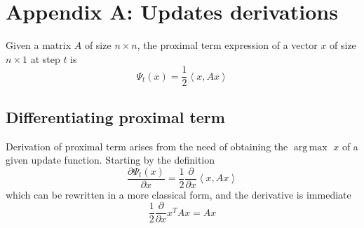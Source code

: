 \documentclass[notitlepage]{article}
\DeclareMathOperator*{\argmax}{arg\,max}
\begin{document}
\newpage




\newpage

\appendix

\section{Appendix A: Updates derivations}
\label{sec:appendix}
Given a matrix $A$ of size $n \times n$, the proximal term expression of a vector $x$ of size $n\times 1$ at step $t$ is
\[
  \Psi_t(x) = \frac{1}{2} \left\langle x, A x \right\rangle  
\]

\subsection{Differentiating proximal term}
Derivation of proximal term arises from the need of obtaining the $\argmax$ $x$ of a given update function. Starting by the definition
\[
  \frac{\partial \Psi_t(x)}{\partial x} = \frac{1}{2} \frac{\partial}{\partial x} \left\langle x, A x \right\rangle  
\]
which can be rewritten in a more classical form, and the derivative is immediate
\[
  \frac{1}{2} \frac{\partial}{\partial x} x^T A x = A x
\]
\end{document}
